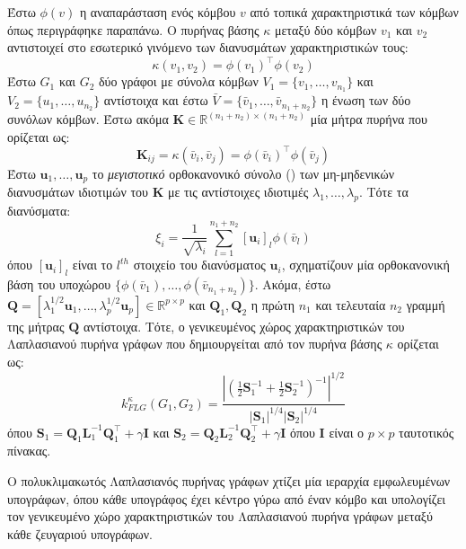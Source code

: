 Έστω $\phi(v)$ η αναπαράσταση ενός κόμβου $v$ από τοπικά χαρακτηριστικά των κόμβων όπως περιγράφηκε παραπάνω.
Ο πυρήνας βάσης $\kappa$ μεταξύ δύο κόμβων $v_1$ και $v_2$ αντιστοιχεί στο εσωτερικό γινόμενο των διανυσμάτων χαρακτηριστικών τους:
\begin{equation}
    \kappa(v_1, v_2) = \phi(v_1)^\top \phi(v_2) 
\end{equation}
Έστω $G_1$ και $G_2$ δύο γράφοι με σύνολα κόμβων $V_1 = \{ v_1, \ldots, v_{n_1}\}$ και $V_2 = \{ u_1, \ldots, u_{n_2} \}$ αντίστοιχα και έστω $\bar{V} = \{ \bar{v}_1, \ldots, \bar{v}_{n_1+n_2} \}$ η ένωση των δύο συνόλων κόμβων.
Έστω ακόμα $\mathbf{K} \in \mathbb{R}^{(n_1+n_2) \times (n_1+n_2)}$ μία μήτρα πυρήνα που ορίζεται ως:
\begin{equation}
    \mathbf{K}_{ij} = \kappa(\bar{v}_i, \bar{v}_j) = \phi(\bar{v}_i)^\top \phi(\bar{v}_j)
\end{equation}
Έστω $\mathbf{u}_1, \ldots, \mathbf{u}_p$ το \textit{μεγιστοτικό} ορθοκανονικό σύνολο () των μη-μηδενικών διανυσμάτων ιδιοτιμών του $\mathbf{K}$
με τις αντίστοιχες ιδιοτιμές $\lambda_1, \ldots, \lambda_p$.
Τότε τα διανύσματα:
\begin{equation}
    \xi_i = \frac{1}{\sqrt{\lambda_i}} \sum_{l=1}^{n_1+n_2} [\mathbf{u}_i]_l \phi(\bar{v}_l)
\end{equation}
όπου $[\mathbf{u}_i]_l$ είναι το $l^{th}$ στοιχείο του διανύσματος $\mathbf{u}_i$, σχηματίζουν μία ορθοκανονική βάση του υποχώρου $\{ \phi(\bar{v}_1), \ldots, \phi(\bar{v}_{n_1+n_2}) \}$.
Ακόμα, έστω $\mathbf{Q} = [ \lambda_1^{1/2} \mathbf{u}_1, \ldots,\lambda_p^{1/2} \mathbf{u}_p ] \in \mathbb{R}^{p \times p}$ και $\mathbf{Q}_1, \mathbf{Q}_2$ η πρώτη $n_1$ και τελευταία $n_2 $ γραμμή της μήτρας $\mathbf{Q}$ αντίστοιχα.
Τότε, ο γενικευμένος χώρος χαρακτηριστικών του Λαπλασιανού πυρήνα γράφων που δημιουργείται από τον πυρήνα βάσης $\kappa$ ορίζεται ως:
\begin{equation}
    k_{FLG}^\kappa(G_1, G_2) = \frac{| (\frac{1}{2} \mathbf{S}_1^{-1} + \frac{1}{2} \mathbf{S}_2^{-1} )^{-1} |^{1/2}}{|\mathbf{S}_1|^{1/4} |\mathbf{S}_2|^{1/4}} 
\end{equation}
όπου $\mathbf{S}_1 = \mathbf{Q}_1 \mathbf{L}_1^{-1} \mathbf{Q}_1^\top + \gamma \mathbf{I}$ και $\mathbf{S}_2 = \mathbf{Q}_2 \mathbf{L}_2^{-1} \mathbf{Q}_2^\top + \gamma \mathbf{I}$ όπου $\mathbf{I}$ είναι ο $p \times p$ ταυτοτικός πίνακας.\par
Ο πολυκλιμακωτός Λαπλασιανός πυρήνας γράφων χτίζει μία ιεραρχία εμφωλευμένων υπογράφων, όπου κάθε υπογράφος έχει κέντρο γύρω από έναν κόμβο και υπολογίζει τον γενικευμένο χώρο χαρακτηριστικών του Λαπλασιανού πυρήνα γράφων μεταξύ κάθε ζευγαριού υπογράφων.

